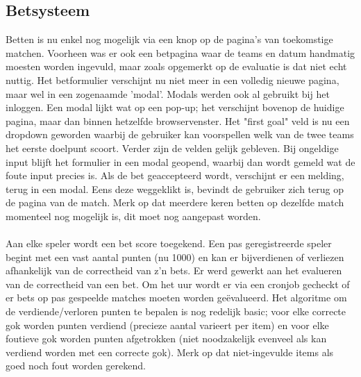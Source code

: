 \documentclass[11pt, a4paper]{article}
\begin{document}
\subsection{Betsysteem}
Betten is nu enkel nog mogelijk via een knop op de pagina's van toekomstige matchen. Voorheen was er ook een betpagina waar de teams en datum handmatig moesten worden ingevuld, maar zoals opgemerkt op de evaluatie is dat niet echt nuttig. Het betformulier verschijnt nu niet meer in een volledig nieuwe pagina, maar wel in een zogenaamde 'modal'. Modals werden ook al gebruikt bij het inloggen. Een modal lijkt wat op een pop-up; het verschijnt bovenop de huidige pagina, maar dan binnen hetzelfde browservenster. Het "first goal" veld is nu een dropdown geworden waarbij de gebruiker kan voorspellen welk van de twee teams het eerste doelpunt scoort. Verder zijn de velden gelijk gebleven. Bij ongeldige input blijft het formulier in een modal geopend, waarbij dan wordt gemeld wat de foute input precies is. Als de bet geaccepteerd wordt, verschijnt er een melding, terug in een modal. Eens deze weggeklikt is, bevindt de gebruiker zich terug op de pagina van de match. Merk op dat meerdere keren betten op dezelfde match momenteel nog mogelijk is, dit moet nog aangepast worden. \\ \\
Aan elke speler wordt een bet score toegekend. Een pas geregistreerde speler begint met een vast aantal punten (nu 1000) en kan er bijverdienen of verliezen afhankelijk van de correctheid van z'n bets. Er werd gewerkt aan het evalueren van de correctheid van een bet. Om het uur wordt er via een cronjob gecheckt of er bets op pas gespeelde matches moeten worden ge\"evalueerd. Het algoritme om de verdiende/verloren punten te bepalen is nog redelijk basic; voor elke correcte gok worden punten verdiend (precieze aantal varieert per item) en voor elke foutieve gok worden punten afgetrokken (niet noodzakelijk evenveel als kan verdiend worden met een correcte gok). Merk op dat niet-ingevulde items als goed noch fout worden gerekend.
\end{document}
